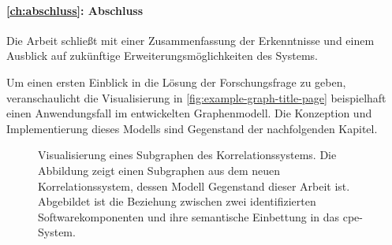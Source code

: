 \paragraph{\autoref{ch:abschluss}: Abschluss}
Die Arbeit schließt mit einer Zusammenfassung der Erkenntnisse und einem Ausblick auf zukünftige Erweiterungsmöglichkeiten des Systems.

\bigskip

Um einen ersten Einblick in die Lösung der Forschungsfrage zu geben, veranschaulicht die Visualisierung in \autoref{fig:example-graph-title-page} beispielhaft einen Anwendungsfall im entwickelten Graphenmodell.
Die Konzeption und Implementierung dieses Modells sind Gegenstand der nachfolgenden Kapitel.

\clearpage
\thispagestyle{empty}
\vspace*{\fill}
\begin{figure}[h!]
    \centering
    \makebox[\textwidth]{}
    \caption{Visualisierung eines Subgraphen des Korrelationssystems. Die Abbildung zeigt einen Subgraphen aus dem neuen Korrelationssystem, dessen Modell Gegenstand dieser Arbeit ist. Abgebildet ist die Beziehung zwischen zwei identifizierten Softwarekomponenten und ihre semantische Einbettung in das \acrshort{cpe}-System.}
    \label{fig:example-graph-title-page}
\end{figure}
\vspace*{\fill}
\clearpage
